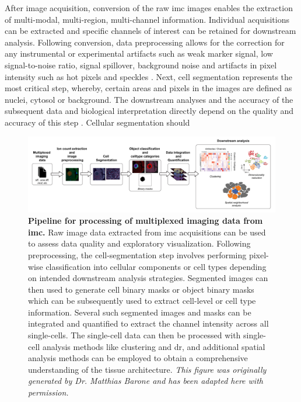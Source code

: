 \par After image acquisition, conversion of the raw \gls{imc} images enables the extraction of multi-modal, multi-region, multi-channel information. Individual acquisitions can be extracted and specific channels of interest can be retained for downstream analysis. Following conversion, data preprocessing allows for the correction for any instrumental or experimental artifacts such as weak marker signal, low signal-to-noise ratio, signal spillover, background noise and artifacts in pixel intensity such as hot pixels and speckles \textbf{\cite{milosevic_different_2023}}. Next, cell segmentation represents the most critical step, whereby, certain areas and pixels in the images are defined as nuclei, cytosol or background. The downstream analyses and the accuracy of the subsequent data and biological interpretation directly depend on the quality and accuracy of this step \textbf{\cite{milosevic_different_2023}}. Cellular segmentation should 


\begin{figure}[H]
    \centering
    \includegraphics[width=\linewidth]{Chapter1/Fig/F1-14-01.png}
    \caption[Overview of  data analysis workflow]{\textbf{Pipeline for processing of multiplexed imaging data from \gls{imc}.} Raw image data extracted from \gls{imc} acquisitions can be used to assess data quality and exploratory visualization. Following preprocessing, the cell-segmentation step involves performing pixel-wise classification into cellular components or cell types depending on intended downstream analysis strategies. Segmented images can then used to generate cell binary masks or object binary masks which can be subsequently used to extract cell-level or cell type information. Several such segmented images and masks can be integrated and quantified to extract the channel intensity across all single-cells. The single-cell data can then be processed with single-cell analysis methods like clustering and \gls{dr}, and additional spatial analysis methods can be employed to obtain a comprehensive understanding of the tissue architecture. \textit{This figure was originally generated by Dr. Matthias Barone and has been adapted here with permission.}}
    \label{fig:chp1_imc_analysis}
\end{figure}

